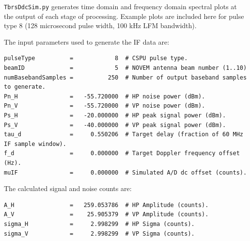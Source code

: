 \documentclass[12pt,english]{article}
\begin{document}
\clearpage
\pagebreak{}

\texttt{TbrsDdcSim.py} generates time domain and frequency domain
spectral plots at the output of each stage of processing. Example
plots are included here for pulse type 8 (128 microsecond pulse width,
100 kHz LFM bandwidth).

The input parameters used to generate the IF data are:
\scriptsize
\begin{verbatim}
pulseType          =            8  # CSPU pulse type.
beamID             =            5  # NOVEM antenna beam number (1..10)
numBasebandSamples =          250  # Number of output baseband samples to generate.
Pn_H               =   -55.720000  # HP noise power (dBm).
Pn_V               =   -55.720000  # VP noise power (dBm).
Ps_H               =   -20.000000  # HP peak signal power (dBm).
Ps_V               =   -40.000000  # VP peak signal power (dBm).
tau_d              =     0.550206  # Target delay (fraction of 60 MHz IF sample window).
f_d                =     0.000000  # Target Doppler frequency offset (Hz).
muIF               =     0.000000  # Simulated A/D dc offset (counts).
\end{verbatim}
\normalsize

The calculated signal and noise counts are:
\scriptsize
\begin{verbatim}
A_H                =   259.053786  # HP Amplitude (counts).
A_V                =    25.905379  # VP Amplitude (counts).
sigma_H            =     2.998299  # HP Sigma (counts).
sigma_V            =     2.998299  # VP Sigma (counts).
\end{verbatim}
\normalsize
\end{document}
